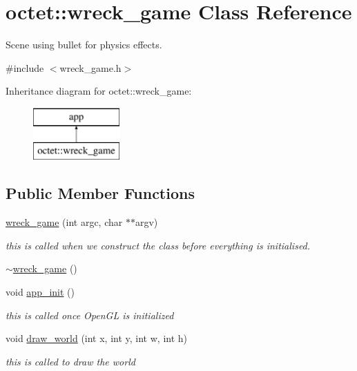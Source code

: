 \hypertarget{classoctet_1_1wreck__game}{\section{octet\+:\+:wreck\+\_\+game Class Reference}
\label{classoctet_1_1wreck__game}
}


Scene using bullet for physics effects.  




{\ttfamily \#include $<$wreck\+\_\+game.\+h$>$}

Inheritance diagram for octet\+:\+:wreck\+\_\+game\+:\begin{figure}[H]
\begin{center}
\leavevmode
\includegraphics[height=2.000000cm]{classoctet_1_1wreck__game}
\end{center}
\end{figure}
\subsection*{Public Member Functions}
\begin{DoxyCompactItemize}
\item 
\hyperlink{classoctet_1_1wreck__game_a3415715222482226f53af7aacc322086}{wreck\+\_\+game} (int argc, char $\ast$$\ast$argv)
\begin{DoxyCompactList}\small\item\em this is called when we construct the class before everything is initialised. \end{DoxyCompactList}\item 
\hyperlink{classoctet_1_1wreck__game_aa9331cd36dbb1205931d048057061e14}{$\sim$wreck\+\_\+game} ()
\item 
void \hyperlink{classoctet_1_1wreck__game_a37f0e2212d11669e135ea848970222b5}{app\+\_\+init} ()
\begin{DoxyCompactList}\small\item\em this is called once Open\+G\+L is initialized \end{DoxyCompactList}\item 
void \hyperlink{classoctet_1_1wreck__game_a43318fc0804e69cf356cc5d35d942a66}{draw\+\_\+world} (int x, int y, int w, int h)
\begin{DoxyCompactList}\small\item\em this is called to draw the world \end{DoxyCompactList}\end{DoxyCompactItemize}


